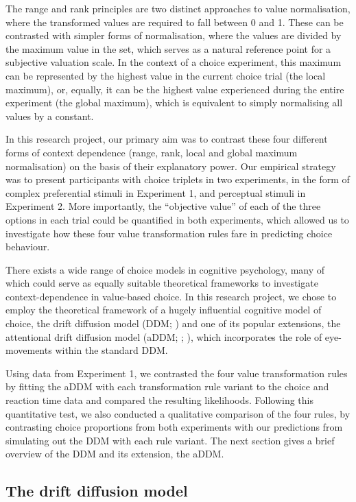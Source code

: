 \documentclass[11pt,a4paper]{article}
\begin{document}
The range and rank principles are two distinct approaches to value normalisation, where the transformed values are required to fall between 0 and 1. These can be contrasted with simpler forms of normalisation, where the values are divided by the maximum value in the set, which serves as a natural reference point for a subjective valuation scale. In the context of a choice experiment, this maximum can be represented by the highest value in the current choice trial (the local maximum), or, equally, it can be the highest value experienced during the entire experiment (the global maximum), which is equivalent to simply normalising all values by a constant.

In this research project, our primary aim was to contrast these four different forms of context dependence (range, rank, local and global maximum normalisation) on the basis of their explanatory power. Our empirical strategy was to present participants with choice triplets in two experiments, in the form of complex preferential stimuli in Experiment 1, and perceptual stimuli in Experiment 2. More importantly, the ``objective value''  of each of the three options in each trial could be quantified in both experiments, which allowed us to investigate how these four value transformation rules fare in predicting choice behaviour.

There exists a wide range of choice models in cognitive psychology, many of which could serve as equally suitable theoretical frameworks to investigate context-dependence in value-based choice. In this research project, we chose to employ the theoretical framework of a hugely influential cognitive model of choice, the drift diffusion model (DDM; ) and one of its popular extensions, the attentional drift diffusion model (aDDM; ; ), which incorporates the role of eye-movements within the standard DDM. 

Using data from Experiment 1, we contrasted the four value transformation rules by fitting the aDDM with each transformation rule variant to the choice and reaction time data and compared the resulting likelihoods. Following this quantitative test, we also conducted a qualitative comparison of the four rules, by contrasting choice proportions from both experiments with our predictions from simulating out the DDM with each rule variant. The next section gives a brief overview of the DDM and its extension, the aDDM.



\subsection{The drift diffusion model} \label{chap1addmexplain}
\end{document}
